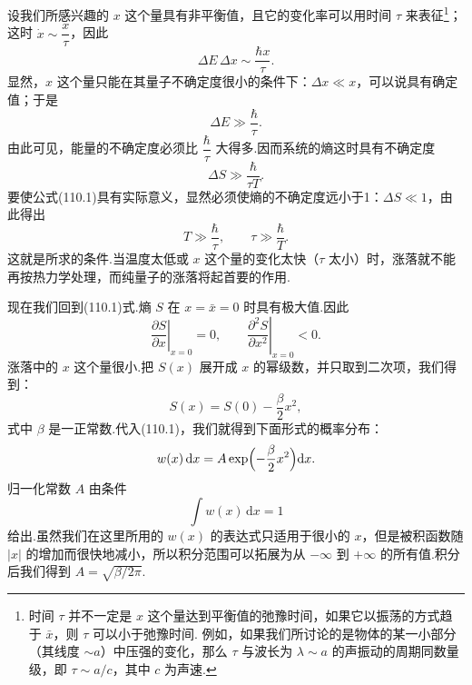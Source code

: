 设我们所感兴趣的 $x$ 这个量具有非平衡值，且它的变化率可以用时间 $\tau$ 来表征\footnote{时间 $\tau$ 并不一定是 $x$ 这个量达到平衡值的弛豫时间，如果它以振荡的方式趋于 $\bar{x}$，则 $\tau$ 可以小于弛豫时间. 例如，如果我们所讨论的是物体的某一小部分（其线度 $\sim a$）中压强的变化，那么 $\tau$ 与波长为 $\lambda\sim a$ 的声振动的周期同数量级，即 $\tau\sim a/c$，其中 $c$ 为声速.}；这时 $\dot{x}\sim\dfrac{x}{\tau}$，因此
\begin{equation*}
  \Delta E\,\Delta x\sim\frac{\hbar x}{\tau}.
\end{equation*}
显然，$x$ 这个量只能在其量子不确定度很小的条件下：$\Delta x\ll x$，可以说具有确定值；于是
\begin{equation*}
  \Delta E\gg\frac{\hbar}{\tau}.
\end{equation*}
由此可见，能量的不确定度必须比 $\dfrac{\hbar}{\tau}$ 大得多.因而系统的熵这时具有不确定度
\begin{equation*}
  \Delta S\gg\frac{\hbar}{\tau T}.
\end{equation*}
要使公式(110.1)具有实际意义，显然必须使熵的不确定度远小于1：$\Delta S\ll1$，由此得出
\begin{equation}
  T\gg\frac{\hbar}{\tau},\qquad \tau\gg\frac{\hbar}{T}.
\end{equation}
这就是所求的条件.当温度太低或 $x$ 这个量的变化太快（$\tau$ 太小）时，涨落就不能再按热力学处理，而纯量子的涨落将起首要的作用.

现在我们回到(110.1)式.熵 $S$ 在 $x=\bar{x}=0$ 时具有极大值.因此
\begin{equation*}
  \left.\frac{\partial S}{\partial x}\right|_{x=0}=0,\qquad
  \left.\frac{\partial^{2}S}{\partial x^{2}}\right|_{x=0}<0.
\end{equation*}
涨落中的 $x$ 这个量很小.把 $S(x)$ 展开成 $x$ 的幂级数，并只取到二次项，我们得到：
\begin{equation}
  S(x)=S(0)-\frac{\beta}{2}x^{2},
\end{equation}
式中 $\beta$ 是一正常数.代入(110.1)，我们就得到下面形式的概率分布：
\begin{equation*}
  w(x)\,\mathrm{d}x=A\exp\Bigl(-\frac{\beta}{2}x^{2}\Bigr)\mathrm{d}x.
\end{equation*}
归一化常数 $A$ 由条件
\begin{equation*}
  \int w(x)\,\mathrm{d}x=1
\end{equation*}
给出.虽然我们在这里所用的 $w(x)$ 的表达式只适用于很小的 $x$，但是被积函数随 $|x|$ 的增加而很快地减小，所以积分范围可以拓展为从 $-\infty$ 到 $+\infty$ 的所有值.积分后我们得到 $A=\sqrt{\beta/2\pi}$.

